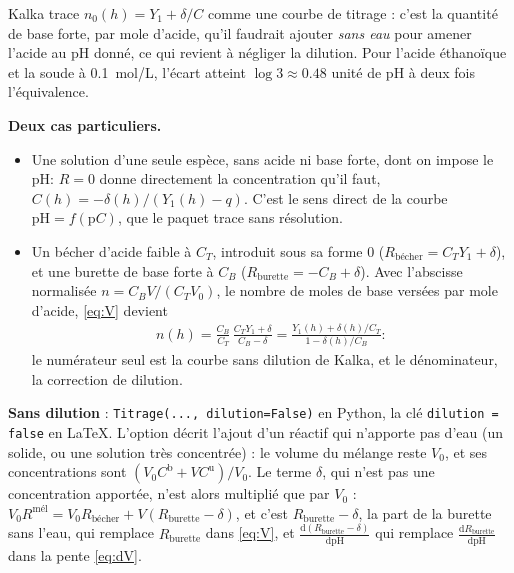 \documentclass[a4paper,11pt]{article}
\newcommand\logo[1]{\hspace{-12pt}\makebox[12pt][l]{#1}}
\newcommand\rmqattention[1]{\begin{tcolorbox}[rmq, vert]\logo{\faExclamationTriangle}#1\end{tcolorbox}}
\newcommand\gras[1]{\textbf{#1}}
\newcommand\rsltm[1]{\boxed{#1}}
\newcommand\pH{\ensuremath{\mathrm{pH}}\xspace}
\newcommand\ddp[2]{\frac{\mathrm{d}#1}{\mathrm{d}#2}}
\newcommand\pare[1]{\left(#1\right)}
\newcommand\code[1]{\texttt{#1}}
\newcommand\Rb{R_\text{bécher}}
\newcommand\Ru{R_\text{burette}}
\begin{document}
\rmqattention{Kalka trace $n_0(h)=Y_1+\delta/C$ comme une courbe de titrage : c'est la quantité de base forte, par mole d'acide, qu'il faudrait ajouter \emph{sans eau} pour amener l'acide au \pH donné, ce qui revient à négliger la dilution.
Pour l'acide éthanoïque et la soude à \qty{0.1}{mol/L}, l'écart atteint $\log3\approx\num{0,48}$ unité de \pH à deux fois l'équivalence.}

\gras{Deux cas particuliers.}
\begin{itemize}
\item Une solution d'une seule espèce, sans acide ni base forte, dont on impose le \pH : $R=0$ donne directement la concentration qu'il faut, $\rsltm{C(h)=-\delta(h)/\pare{Y_1(h)-q}}$.
C'est le sens direct de la courbe $\pH=f(\mathrm pC)$, que le paquet trace sans résolution.
\item Un bécher d'acide faible à $C_T$, introduit sous sa forme 0 ($\Rb=C_TY_1+\delta$), et une burette de base forte à $C_B$ ($\Ru=-C_B+\delta$).
Avec l'abscisse normalisée $n=C_BV/(C_TV_0)$, le nombre de moles de base versées par mole d'acide, \eqref{eq:V} devient
\begin{align}
n(h)=\frac{C_B}{C_T}\,\frac{C_TY_1+\delta}{C_B-\delta}=\frac{Y_1(h)+\delta(h)/C_T}{1-\delta(h)/C_B} :
\end{align}
le numérateur seul est la courbe sans dilution de Kalka, et le dénominateur, la correction de dilution.
\end{itemize}

\begin{option}
\gras{Sans dilution} : \code{Titrage(..., dilution=False)} en Python, la clé \code{dilution = false} en \LaTeX.
L'option décrit l'ajout d'un réactif qui n'apporte pas d'eau (un solide, ou une solution très concentrée) : le volume du mélange reste $V_0$, et ses concentrations sont $\pare{V_0C^\text{b}+VC^\text{u}}/V_0$.
Le terme $\delta$, qui n'est pas une concentration apportée, n'est alors multiplié que par $V_0$ : $V_0R^\text{mél}=V_0\Rb+V\pare{\Ru-\delta}$, et c'est $\Ru-\delta$, la part de la burette sans l'eau, qui remplace $\Ru$ dans \eqref{eq:V}, et $\ddp{\pare{\Ru-\delta}}\pH$ qui remplace $\ddp\Ru\pH$ dans la pente \eqref{eq:dV}.
\end{option}
\end{document}
